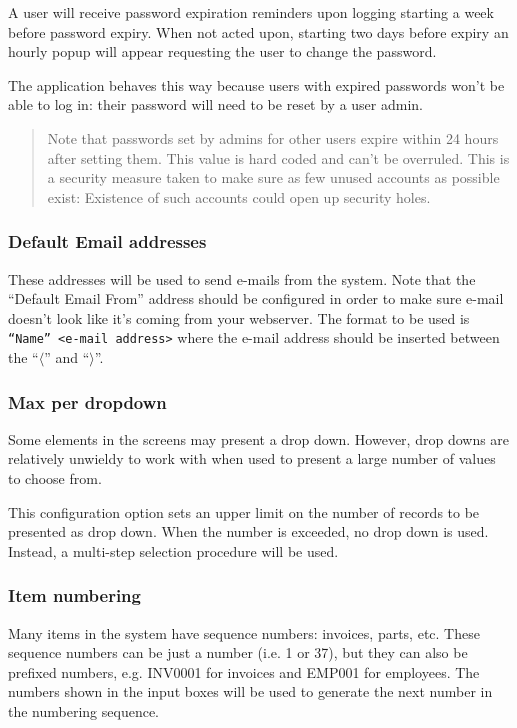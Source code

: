 A user will receive password expiration reminders upon logging starting a week before password
expiry. When not acted upon, starting two days before expiry an hourly popup will appear
requesting the user to change the password.

The application behaves this way because users with expired passwords won't be able to log in:
their password will need to be reset by a user admin.

\begin{quotation}
Note that passwords set by admins for other users expire within 24 hours after setting them.
This value is hard coded and can't be overruled. This is a security measure taken to make
sure as few unused accounts as possible exist: Existence of such accounts could open up security
holes.
\end{quotation}


\subsubsection{Default Email addresses}

These addresses will be used to send e-mails from the system.
Note that the ``Default Email From'' address should be configured in order to make sure
e-mail doesn't look like it's coming from your webserver. The format to be used is \texttt{``Name'' <e-mail address>} where the e-mail address should be inserted between the
``$\langle$'' and ``$\rangle$''.

\subsubsection{Max per dropdown}

Some elements in the screens may present a drop down. However, drop downs are
relatively unwieldy to work with when used to present a large number of values
to choose from.

This configuration option sets an upper limit on the number of records to be
presented as drop down.  When the number is exceeded, no drop down is used.  Instead,
a multi-step selection procedure will be used.

\subsubsection{Item numbering}
\label{sec:DefaultsItemNumbering}

Many items in the system have sequence numbers: invoices, parts, etc.
 These sequence numbers can be just a number (i.e. 1 or 37),
but they can also be prefixed numbers, e.g. INV0001 for invoices and EMP001 for employees.
The numbers shown in the input boxes will be used to generate the next number in the
numbering sequence.

